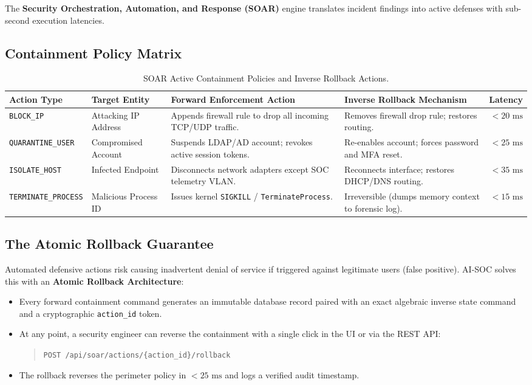 \documentclass[11pt,a4paper]{article}
\begin{document}
The \textbf{Security Orchestration, Automation, and Response (SOAR)} engine translates incident findings into active defenses with sub-second execution latencies.

\subsection{Containment Policy Matrix}

\begin{table}[h!]
\centering
\small
\begin{tabularx}{\textwidth}{l p{2.8cm} X p{3.2cm} r}
\toprule
\textbf{Action Type} & \textbf{Target Entity} & \textbf{Forward Enforcement Action} & \textbf{Inverse Rollback Mechanism} & \textbf{Latency} \\
\midrule
\texttt{BLOCK\_IP} & Attacking IP Address & Appends firewall rule to drop all incoming TCP/UDP traffic. & Removes firewall drop rule; restores routing. & $< 20\text{ ms}$ \\
\texttt{QUARANTINE\_USER} & Compromised Account & Suspends LDAP/AD account; revokes active session tokens. & Re-enables account; forces password and MFA reset. & $< 25\text{ ms}$ \\
\texttt{ISOLATE\_HOST} & Infected Endpoint & Disconnects network adapters except SOC telemetry VLAN. & Reconnects interface; restores DHCP/DNS routing. & $< 35\text{ ms}$ \\
\texttt{TERMINATE\_PROCESS} & Malicious Process ID & Issues kernel \texttt{SIGKILL} / \texttt{TerminateProcess}. & Irreversible (dumps memory context to forensic log). & $< 15\text{ ms}$ \\
\bottomrule
\end{tabularx}
\caption{SOAR Active Containment Policies and Inverse Rollback Actions.}
\end{table}

\subsection{The Atomic Rollback Guarantee}
Automated defensive actions risk causing inadvertent denial of service if triggered against legitimate users (false positive). AI-SOC solves this with an \textbf{Atomic Rollback Architecture}:
\begin{itemize}
    \item Every forward containment command generates an immutable database record paired with an exact algebraic inverse state command and a cryptographic \texttt{action\_id} token.
    \item At any point, a security engineer can reverse the containment with a single click in the UI or via the REST API:
    \begin{quote}
        \texttt{POST /api/soar/actions/\{action\_id\}/rollback}
    \end{quote}
    \item The rollback reverses the perimeter policy in $< 25\text{ ms}$ and logs a verified audit timestamp.
\end{itemize}
\end{document}
